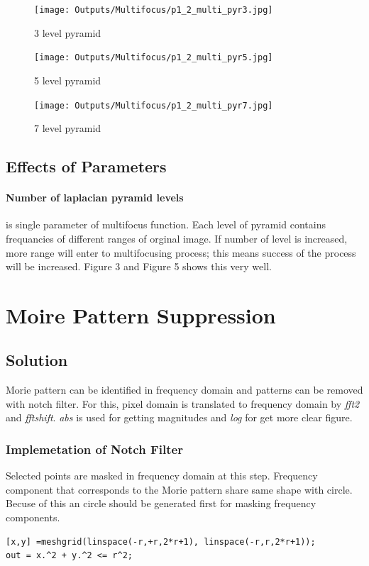 \documentclass[12pt]{article}
\begin{document}
\begin{figure}[H]
\centering
\texttt{[image: Outputs/Multifocus/p1\_2\_multi\_pyr3.jpg]}
\caption{3 level pyramid}
\end{figure}

\begin{figure}[H]
\centering
\texttt{[image: Outputs/Multifocus/p1\_2\_multi\_pyr5.jpg]}
\caption{5 level pyramid}
\end{figure}

\begin{figure}[H]
\centering
\texttt{[image: Outputs/Multifocus/p1\_2\_multi\_pyr7.jpg]}
\caption{7 level pyramid}
\end{figure}

\subsection{Effects of Parameters}
\paragraph{Number of laplacian pyramid levels}is single parameter of multifocus function. Each level of pyramid contains frequancies of different ranges of orginal image. If number of level is increased, more range will enter to multifocusing process; this means success of the process will be increased. Figure 3 and Figure 5 shows this very well.

\section{Moire Pattern Suppression}
\subsection{Solution}
Morie pattern can be identified in frequency domain and patterns can be removed with notch filter. For this, pixel domain is translated to frequency domain by \textit{fft2} and \textit{fftshift}. \textit{abs} is used for getting magnitudes and \textit{log} for get more clear figure. 
\subsubsection{Implemetation of Notch Filter}
Selected points are masked in frequency domain at this step. Frequency component that corresponds to the Morie pattern share same shape with circle. Becuse of this an circle should be generated first for masking frequency components.  
\\
\begin{lstlisting}
[x,y] =meshgrid(linspace(-r,+r,2*r+1), linspace(-r,r,2*r+1));
out = x.^2 + y.^2 <= r^2;
\end{lstlisting}
\end{document}
